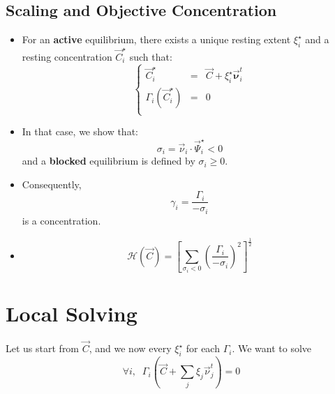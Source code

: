 \documentclass[aps,12pt]{revtex4}
\begin{document}
\subsection{Scaling and Objective Concentration}

\begin{itemize}
\item For an {\bf active} equilibrium, there exists a unique resting extent $\xi_i^\star$ and a resting concentration $\vec{C}_i^\star$ such that:
\begin{equation}
\left\lbrace
\begin{array}{rcl}
	\vec{C}_i^\star & = & \vec{C} + \xi_i^\star \vec{\bm{\nu}}^t_i\\
	\Gamma_i(\vec{C}_i^\star) & = & 0 \\
\end{array}
\right.
\end{equation}

\item In that case, we show that:
\begin{equation}
	\sigma_i = \vec{\nu}_i \cdot \vec{\Psi}_i^\star < 0
\end{equation}	
and a {\bf blocked} equilibrium is defined by $\sigma_i\geq 0$.

\item Consequently,
\begin{equation}
	\gamma_i = \dfrac{\Gamma_i}{-\sigma_i} 
\end{equation}
is a concentration.

\item \begin{equation}
\mathcal{H}(\vec{C}) = \left\lbrack\sum_{\sigma_i<0} \left(\dfrac{\Gamma_i}{-\sigma_i}\right)^2 \right\rbrack^{\frac{1}{2}}
\end{equation}

 
\end{itemize}
 
 
 
\section{Local Solving}

Let us start from $\vec{C}$, and we now every $\xi_i^\star$ for each $\Gamma_i$.
We want to solve
\begin{equation}
\forall i, \;\; \Gamma_i\left(\vec{C} + \sum_j \xi_j \vec{\nu}^t_j\right) =  0
\end{equation}
\end{document}
